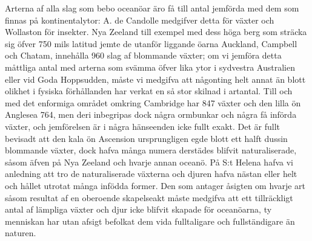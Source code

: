 Arterna af alla slag som bebo oceanöar äro få till antal jemförda med dem som finnas på kontinentalytor: A. de Candolle medgifver detta för växter och Wollaston för insekter. Nya Zeeland till exempel med dess höga berg som sträcka sig öfver 750 mils latitud jemte de utanför liggande öarna Auckland, Campbell och Chatam, innehålla 960 slag af blommande växter; om vi jemföra detta måttliga antal med arterna som svämma öfver lika ytor i sydvestra Australien eller vid Goda Hoppsudden, måste vi medgifva att någonting helt annat än blott olikhet i fysiska förhållanden har verkat en så stor skilnad i artantal. Till och med det enformiga området omkring Cambridge har 847 växter och den lilla ön Anglesea 764, men deri inbegripas dock några ormbunkar och några få införda växter, och jemförelsen är i några hänseenden icke fullt exakt. Det är fullt bevisadt att den kala ön Ascension ursprungligen egde blott ett halft dussin blommande växter, dock hafva många numera derstädes blifvit naturaliserade, såsom äfven på Nya Zeeland och hvarje annan oceanö. På S:t Helena hafva vi anledning att tro de naturaliserade växterna och djuren hafva nästan eller helt och hållet utrotat många infödda former. Den som antager åsigten om hvarje art såsom resultat af en oberoende skapelseakt måste medgifva att ett tillräckligt antal af lämpliga växter och djur icke blifvit skapade för oceanöarna, ty menniskan har utan afsigt befolkat dem vida fulltaligare och fullständigare än naturen.

